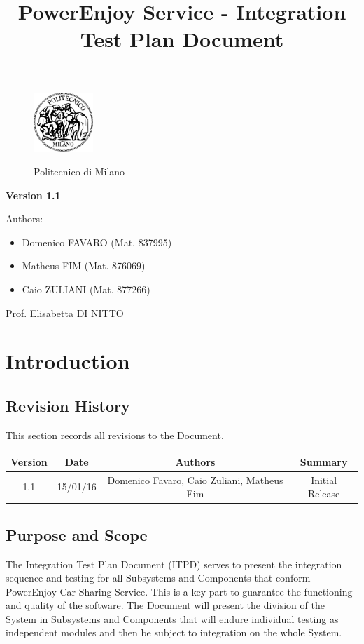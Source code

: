 \documentclass[a4paper]{article}
\title{PowerEnjoy Service - Integration Test Plan Document}
\begin{document}
\begin{titlepage}
\begin{figure}
\centering
\includegraphics[width=0.2\textwidth]{polimi.jpg}
\par
\LARGE Politecnico di Milano
\end{figure}


\maketitle
\textbf{Version 1.1}
\newline

\raggedright
Authors:
\begin{itemize}
	\item Domenico FAVARO (Mat. 837995)
        	\item Matheus FIM (Mat. 876069)
	\item Caio ZULIANI (Mat. 877266)	
\end{itemize}
\raggedleft
Prof. Elisabetta DI NITTO
\thispagestyle{empty}
\end{titlepage}

\tableofcontents
\newpage
 
\section{Introduction}
\subsection{Revision History}
This section records all revisions to the Document.
\newline \newline
\begin{tabular}{ | c | c | c | c | }
\hline
	Version & Date & Authors & Summary \\ \hline
	1.1 & 15/01/16 & Domenico Favaro, Caio Zuliani, Matheus Fim & Initial Release  \\ \hline
\end{tabular}

\subsection{Purpose and Scope}
The Integration Test Plan Document (ITPD) serves to present the integration sequence and testing for all Subsystems and Components that conform PowerEnjoy Car Sharing Service. This is a key part to guarantee the functioning and quality of the software. The Document will present the division of the System in Subsystems and Components that will endure individual testing as independent modules and then be subject to integration on the whole System.
\end{document}
